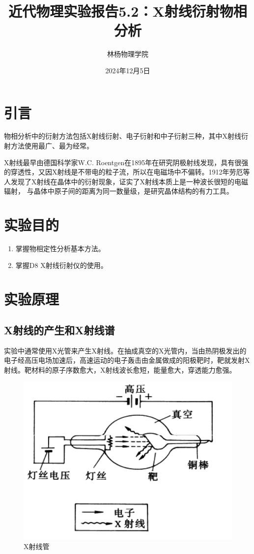 \documentclass[a4paper]{article}
\title{近代物理实验报告5.2：X射线衍射物相分析}
\author{林杨\quad 211840092\quad 物理学院}
\date{2024年12月5日}
\begin{document}
\maketitle


\section{引言}
物相分析中的衍射方法包括X射线衍射、电子衍射和中子衍射三种，其中X射线衍射方法使用最广、最为经常。

X射线最早由德国科学家W.C. Roentgen在1895年在研究阴极射线发现，具有很强的穿透性，又因X射线是不带电的粒子流，所以在电磁场中不偏转。1912年劳厄等人发现了X射线在晶体中的衍射现象，证实了X射线本质上是一种波长很短的电磁辐射，
与晶体中原子间的距离为同一数量级，是研究晶体结构的有力工具。
\section{实验目的}
\begin{enumerate}
\item 掌握物相定性分析基本方法。
\item 掌握D8 X射线衍射仪的使用。
\end{enumerate}


\section{实验原理}

\subsection{X射线的产生和X射线谱}
实验中通常使用X光管来产生X射线。在抽成真空的X光管内，当由热阴极发出的电子经高压电场加速后，高速运动的电子轰击由金属做成的阳极靶时，靶就发射X射线。靶材料的原子序数愈大，X射线波长愈短，能量愈大，穿透能力愈强。
\begin{figure}[H]
	\centering
	\includegraphics[width=0.5\linewidth]{fig/X1.jpg}
	\caption{X射线管}
\end{figure}
\end{document}
